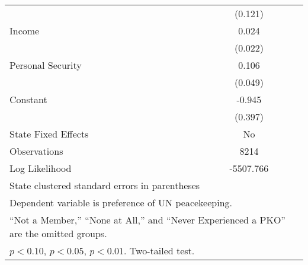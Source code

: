 \begin{center}
\begin{singlespace}
\begin{longtable}{l c}
                    &     (0.121)        \\
[0.25em]
Income              &       0.024        \\
                    &     (0.022)        \\
[0.25em]
Personal Security   &       0.106\sym{*} \\
                    &     (0.049)        \\
[0.25em]
Constant            &      -0.945\sym{*} \\
                    &     (0.397)        \\
\hline
State Fixed Effects &          No        \\
Observations        &    8214      \\
Log Likelihood      &    -5507.766        \\
\hline\hline
\multicolumn{2}{l}{\footnotesize State clustered standard errors in parentheses}\\
\multicolumn{2}{l}{\footnotesize Dependent variable is preference of UN peacekeeping.}\\
\multicolumn{2}{l}{\footnotesize ``Not a Member,'' ``None at All,'' and ``Never Experienced a PKO'' are the omitted groups.}\\
\multicolumn{2}{l}{\footnotesize \sym{+} \(p<0.10\), \sym{*} \(p<0.05\), \sym{**} \(p<0.01\). Two-tailed test.}\\
\end{longtable}
\end{singlespace}
\end{center}